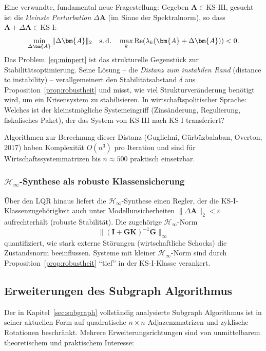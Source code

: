 \documentclass[a4paper, 12pt, twoside, openright]{report}
\theoremstyle{definition}
\theoremstyle{definition}
\newcommand{\vA}{\bm{A}}
\newcommand{\vI}{\bm{I}}
\newcommand{\vK}{\bm{K}}
\newcommand{\vG}{\bm{G}}
\newcommand{\re}{\mathrm{Re}}
\newcommand{\KS}{\mathrm{KS}}
\begin{document}
Eine verwandte, fundamental neue Fragestellung: Gegeben $\vA \in \KS\text{-III}$,
gesucht ist die \emph{kleinste Perturbation} $\Delta\vA$ (im Sinne der Spektralnorm),
so dass $\vA + \Delta\vA \in \KS\text{-I}$:
\begin{equation}
  \min_{\Delta\vA} \|\Delta\vA\|_2 \quad \text{s.\,d.} \quad
  \max_k \re(\lambda_k(\vA + \Delta\vA)) < 0.
  \label{eq:minpert}
\end{equation}
Das Problem~\eqref{eq:minpert} ist das strukturelle Gegenstück zur
Stabilitätsoptimierung. Seine Lösung -- die \emph{Distanz zum instabilen Rand} (distance
to instability) -- verallgemeinert den Stabilitätsabstand $\delta$ aus
Proposition~\ref{prop:robustheit} und misst, wie viel Strukturveränderung benötigt wird,
um ein Krisensystem zu stabilisieren. In wirtschaftspolitischer Sprache: Welches ist
der kleinstmögli\-che System\-eingriff (Zinsänderung, Regulierung, fiskalisches Paket),
der das System von KS-III nach KS-I transferiert?

Algorithmen zur Berechnung dieser Distanz (Guglielmi, Gürbüzbalaban, Overton, 2017)
haben Komplexität $O(n^3)$ pro Iteration und sind für Wirtschaftssystemmatrizen
bis $n \approx 500$ praktisch einsetzbar.

\subsubsection*{$\mathcal{H}_\infty$-Synthese als robuste Klassensicherung}

Über den LQR hinaus liefert die $\mathcal{H}_\infty$-Synthese einen Regler, der
die KS-I-Klassenzugehörig\-keit auch unter Modellunsicherheiten $\|\Delta\vA\|_2 < \varepsilon$
aufrecht\-erhält (robuste Stabilität). Die zugehörige $\mathcal{H}_\infty$-Norm
\[
  \|(\vI + \vG\vK)^{-1}\vG\|_\infty
\]
quantifiziert, wie stark externe Störungen
(wirtschaftliche Schocks) die Zustandsnorm beeinflussen. Systeme mit kleiner
$\mathcal{H}_\infty$-Norm sind durch Proposition~\ref{prop:robustheit} ``tief''
in der KS-I-Klasse verankert.

\subsection{Erweiterungen des Subgraph Algorithmus}
\label{subsec:subgraph_erw}

Der in Kapitel~\ref{sec:subgraph} vollständig analysierte Subgraph Algorithmus
\citep{epp2026subgraph} ist in seiner aktuellen Form auf quadratische
$n \times n$-Adjazenzmatrizen und zyklische Rotationen beschränkt. Mehrere
Erweiterungsrichtungen sind von unmittelbarem theoretischem und praktischem Interesse:
\end{document}
